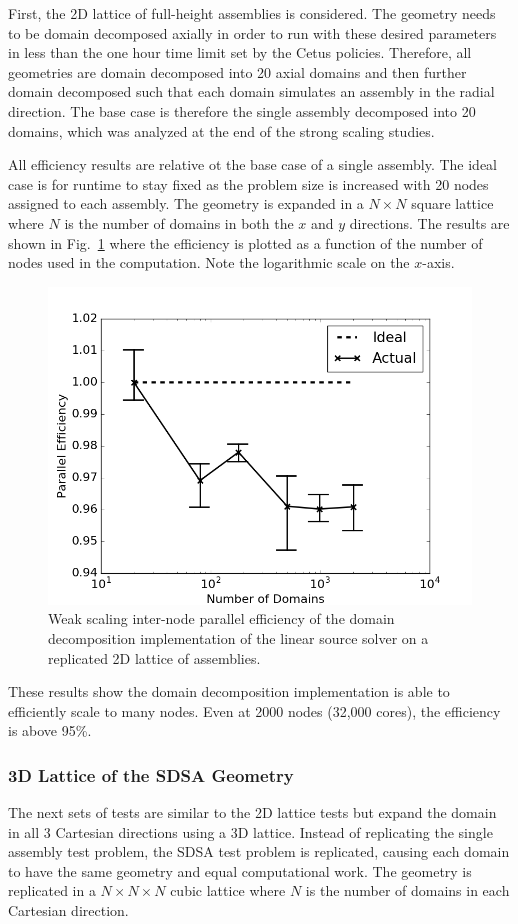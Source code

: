 First, the 2D lattice of full-height assemblies is considered. The geometry needs to be domain decomposed axially in order to run with these desired parameters in less than the one hour time limit set by the Cetus policies. Therefore, all geometries are domain decomposed into 20 axial domains and then further domain decomposed such that each domain simulates an assembly in the radial direction. The base case is therefore the single assembly decomposed into 20 domains, which was analyzed at the end of the strong scaling studies.

All efficiency results are relative ot the base case of a single assembly. The ideal case is for runtime to stay fixed as the problem size is increased with 20 nodes assigned to each assembly. The geometry is expanded in a $N \times N$ square lattice where $N$ is the number of domains in both the $x$ and $y$ directions. The results are shown in Fig.~\ref{fig:dd-ws-2D} where the efficiency is plotted as a function of the number of nodes used in the computation. Note the logarithmic scale on the $x$-axis.

\begin{figure}[h!]
	\centering
	\includegraphics[width=0.6\linewidth]{figures/DD/dd-ws-2D.png}
	\caption[]{Weak scaling inter-node parallel efficiency of the domain decomposition implementation of the linear source solver on a replicated 2D lattice of assemblies.}
	\label{fig:dd-ws-2D}
\end{figure}

These results show the domain decomposition implementation is able to efficiently scale to many nodes. Even at 2000 nodes (32,000 cores), the efficiency is above 95\%.

\subsubsection{3D Lattice of the SDSA Geometry}

The next sets of tests are similar to the 2D lattice tests but expand the domain in all 3 Cartesian directions using a 3D lattice. Instead of replicating the single assembly test problem, the SDSA test problem is replicated, causing each domain to have the same geometry and equal computational work. The geometry is replicated in a $N \times N \times N$ cubic lattice where $N$ is the number of domains in each Cartesian direction.

